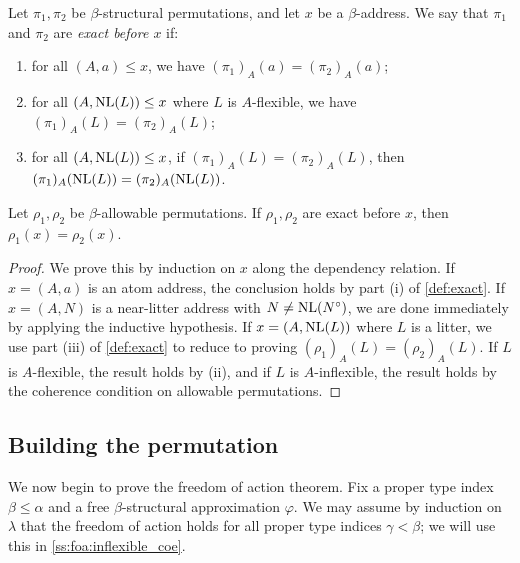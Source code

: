 \begin{definition}
    \label{def:exact}
    Let \( \pi_1, \pi_2 \) be \( \beta \)-structural permutations, and let \( x \) be a \( \beta \)-address.
    We say that \( \pi_1 \) and \( \pi_2 \) are \emph{exact before \( x \)} if:
    \begin{enumerate}
        \item for all \( (A, a) \leq x \), we have \( (\pi_1)_A(a) = (\pi_2)_A(a) \);
        \item for all \( (A, \operatorname{NL}(L)) \leq x \) where \( L \) is \( A \)-flexible, we have \( (\pi_1)_A(L) = (\pi_2)_A(L) \);
        \item for all \( (A, \operatorname{NL}(L)) \leq x \), if \( (\pi_1)_A(L) = (\pi_2)_A(L) \), then \( (\pi_1)_A(\operatorname{NL}(L)) = (\pi_2)_A(\operatorname{NL}(L)) \).
    \end{enumerate}
\end{definition}

\begin{lemma}
    \label{lem:exact}
    Let \( \rho_1, \rho_2 \) be \( \beta \)-allowable permutations.
    If \( \rho_1, \rho_2 \) are exact before \( x \), then \( \rho_1(x) = \rho_2(x) \).
\end{lemma}
\begin{proof}
    We prove this by induction on \( x \) along the dependency relation.
    If \( x = (A, a) \) is an atom address, the conclusion holds by part (i) of \cref{def:exact}.
    If \( x = (A, N) \) is a near-litter address with \( N \neq \operatorname{NL}(N^\circ) \), we are done immediately by applying the inductive hypothesis.
    If \( x = (A, \operatorname{NL}(L)) \) where \( L \) is a litter, we use part (iii) of \cref{def:exact} to reduce to proving \( (\rho_1)_A(L) = (\rho_2)_A(L) \).
    If \( L \) is \( A \)-flexible, the result holds by (ii), and if \( L \) is \( A \)-inflexible, the result holds by the coherence condition on allowable permutations.
\end{proof}

\subsection{Building the permutation}

We now begin to prove the freedom of action theorem.
Fix a proper type index \( \beta \leq \alpha \) and a free \( \beta \)-structural approximation \( \varphi \).
We may assume by induction on \( \lambda \) that the freedom of action holds for all proper type indices \( \gamma < \beta \); we will use this in \cref{ss:foa:inflexible_coe}.

